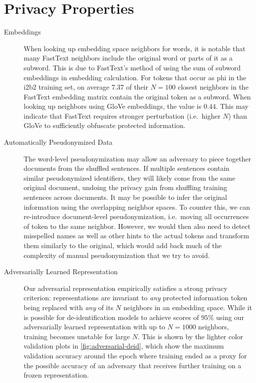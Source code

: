 \section{Privacy Properties}

\begin{description}
    \item[Embeddings]
    When looking up embedding space neighbors for words, it is notable that many FastText neighbors include the original word or parts of it as a subword.
    This is due to FastText's method of using the sum of subword embeddings in embedding calculation.
    For tokens that occur as \ac{phi} in the i2b2 training set, on average $7.37$ of their $N=100$ closest neighbors in the FastText embedding matrix contain the original token as a subword.
    When looking up neighbors using GloVe embeddings, the value is $0.44$.
    This may indicate that FastText requires stronger perturbation (i.e.\ higher $N$) than GloVe to sufficiently obfuscate protected information.
    
    \item[Automatically Pseudonymized Data]
    The word-level pseudonymization may allow an adversary to piece together documents from the shuffled sentences.
    If multiple sentences contain similar pseudonymized identifiers, they will likely come from the same original document, undoing the privacy gain from shuffling training sentences across documents.
    It may be possible to infer the original information using the overlapping neighbor spaces.
    To counter this, we can re-introduce document-level pseudonymization, i.e.\ moving all occurrences of  token to the same neighbor.
    However, we would then also need to detect misspelled names as well as other hints to the actual tokens and transform them similarly to the original, which would add back much of the complexity of manual pseudonymization that we try to avoid.
    
    \item[Adversarially Learned Representation]
    Our adversarial representation empirically satisfies a strong privacy criterion: representations are invariant to \textit{any} protected information token being replaced with \textit{any} of its $N$ neighbors in an embedding space.
    While it is possible for de-identification models to achieve \fone scores of $95\%$ using our adversarially learned representation with up to $N=1000$ neighbors, training becomes unstable for large $N$.
    This is shown by the lighter color validation plots in \cref{fig:adversarial-deid}, which show the maximum validation accuracy around the epoch where training ended as a proxy for the possible accuracy of an adversary that receives further training on a frozen representation.
    

\end{description}
